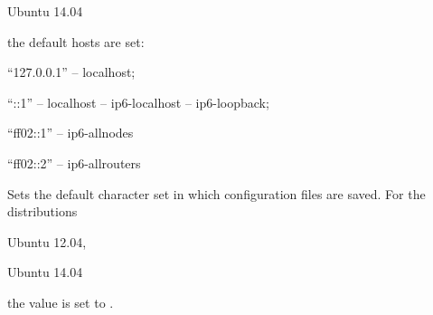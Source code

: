 \begin{inparaitem}
\item[\TheDistribution{ubuntu}] Ubuntu 14.04
\end{inparaitem}
the default hosts are set:
\begin{compactitem}
\item ``127.0.0.1'' -- localhost;
\item ``::1'' -- localhost -- ip6-localhost -- ip6-loopback;
\item ``ff02::1'' -- ip6-allnodes
\item ``ff02::2'' -- ip6-allrouters
\end{compactitem}


Sets the default character set  in which configuration files are 
saved. For the distributions
\begin{inparaitem}
\item[\TheDistribution{ubuntu}] Ubuntu 12.04,
\item[\TheDistribution{ubuntu}] Ubuntu 14.04
\end{inparaitem}
the value is set to .
